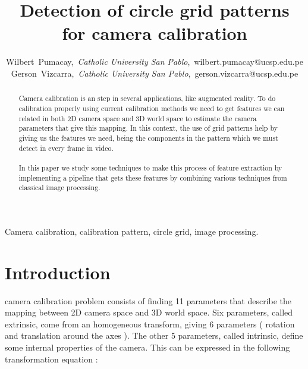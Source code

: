 \documentclass[journal]{IEEEtran}
\begin{document}
\title{Detection of circle grid patterns \\ for camera calibration}

\author{Wilbert~Pumacay,~\textit{Catholic University San Pablo},~wilbert.pumacay@ucsp.edu.pe\\
        Gerson~Vizcarra,~\textit{Catholic University San Pablo},~gerson.vizcarra@ucsp.edu.pe}

\maketitle

\begin{abstract}
Camera calibration is an step in several applications, like augmented reality. To do calibration properly using current calibration methods we need to get features we can related in both 2D camera space and 3D world space to estimate the camera parameters that give this mapping. In this context, the use of grid patterns help by giving us the features we need, being the components in the pattern which we must detect in every frame in video.
\\
\\
In this paper we study some techniques to make this process of feature extraction by implementing a pipeline that gets these features by combining various techniques from classical image processing.
\end{abstract}

\begin{IEEEkeywords}
Camera calibration, calibration pattern, circle grid, image processing.
\end{IEEEkeywords}


\section{Introduction}

 camera calibration problem consists of finding 11 parameters that describe the mapping between 2D camera space and 3D world space. Six parameters, called extrinsic, come from an homogeneous transform, giving 6 parameters ( rotation and translation around the axes ). The other 5 parameters, called intrinsic, define some internal properties of the camera. This can be expressed in the following transformation equation :
\end{document}
